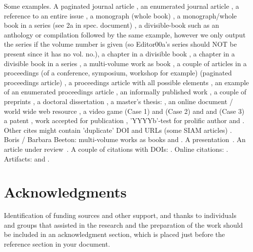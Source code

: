   Some examples.  A paginated journal article \cite{Abril07}, an
  enumerated journal article \cite{Cohen07}, a reference to an entire
  issue \cite{JCohen96}, a monograph (whole book) \cite{Kosiur01}, a
  monograph/whole book in a series (see 2a in spec. document)
  \cite{Harel79}, a divisible-book such as an anthology or compilation
  \cite{Editor00} followed by the same example, however we only output
  the series if the volume number is given \cite{Editor00a} (so
  Editor00a's series should NOT be present since it has no vol. no.),
  a chapter in a divisible book \cite{Spector90}, a chapter in a
  divisible book in a series \cite{Douglass98}, a multi-volume work as
  book \cite{Knuth97}, a couple of articles in a proceedings (of a
  conference, symposium, workshop for example) (paginated proceedings
  article) \cite{Andler79, Hagerup1993}, a proceedings article with
  all possible elements \cite{Smith10}, an example of an enumerated
  proceedings article \cite{VanGundy07}, an informally published work
  \cite{Harel78}, a couple of preprints \cite{Bornmann2019,
    AnzarootPBM14}, a doctoral dissertation \cite{Clarkson85}, a
  master's thesis: \cite{anisi03}, an online document / world wide web
  resource \cite{Thornburg01, Ablamowicz07, Poker06}, a video game
  (Case 1) \cite{Obama08} and (Case 2) \cite{Novak03} and \cite{Lee05}
  and (Case 3) a patent \cite{JoeScientist001}, work accepted for
  publication \cite{rous08}, 'YYYYb'-test for prolific author
  \cite{SaeediMEJ10} and \cite{SaeediJETC10}. Other cites might
  contain 'duplicate' DOI and URLs (some SIAM articles)
  \cite{Kirschmer:2010:AEI:1958016.1958018}. Boris / Barbara Beeton:
  multi-volume works as books \cite{MR781536} and \cite{MR781537}. A
  presentation~\cite{Reiser2014}. An article under
  review~\cite{Baggett2025}. A
  couple of citations with DOIs:
  \cite{2004:ITE:1009386.1010128,Kirschmer:2010:AEI:1958016.1958018}. Online
  citations: \cite{TUGInstmem, Thornburg01, CTANacmart}.
  Artifacts: \cite{R} and \cite{UMassCitations}.

\section{Acknowledgments}

Identification of funding sources and other support, and thanks to
individuals and groups that assisted in the research and the
preparation of the work should be included in an acknowledgment
section, which is placed just before the reference section in your
document.

